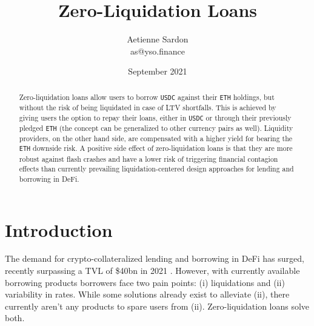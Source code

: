 \documentclass[a4paper]{article}
\title{Zero-Liquidation Loans}
\author{Aetienne Sardon\\\small as@yso.finance}
\date{September 2021}
\begin{document}
\maketitle




\begin{abstract}
Zero-liquidation loans allow users to borrow \verb|USDC| against their \verb|ETH| holdings, but without the risk of being liquidated in case of LTV shortfalls. This is achieved by giving users the option to repay their loans, either in \verb|USDC| or through their previously pledged \verb|ETH| (the concept can be generalized to other currency pairs as well). Liquidity providers, on the other hand side, are compensated with a higher yield for bearing the \verb|ETH| downside risk. A positive side effect of zero-liquidation loans is that they are more robust against flash crashes and have a lower risk of triggering financial contagion effects than currently prevailing liquidation-centered design approaches for lending and borrowing in DeFi. %
\end{abstract}

\section{Introduction}
The demand for crypto-collateralized lending and borrowing in DeFi has surged, recently surpassing a TVL of \$40bn in 2021 \cite{aave} \cite{compound}. However, with currently available borrowing products borrowers face two pain points: (i) liquidations and (ii) variability in rates. While some solutions already exist to alleviate (ii), there currently aren't any products to spare users from (ii). Zero-liquidation loans solve both.\\
\end{document}

